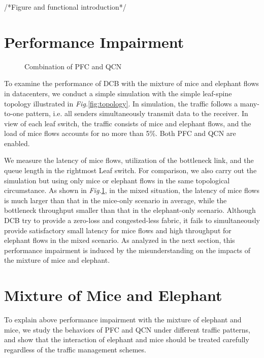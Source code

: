 \documentclass[]{sig-alternate-10pt}
\begin{document}
/*Figure and functional introduction*/
\fi
 \section{Performance Impairment}
\label{motivation}


\begin{figure}
	\centering
	\hfill
\caption{Combination of PFC and QCN}
\label{fig:impairment}
\end{figure}

To examine the performance of DCB with the mixture of mice and elephant flows in datacenters, we conduct a simple simulation with the simple leaf-spine topology illustrated in \emph{Fig.}\ref{fig:topology}.
In simulation, the traffic follows a many-to-one pattern, i.e. all senders simultaneously transmit data to the receiver.
In view of each leaf switch, the traffic consists of mice and elephant flows, and the load of mice flows accounts for no more than 5\%. Both PFC and QCN are enabled.


We measure the latency of mice flows, utilization of the bottleneck link, and the queue length in the rightmost Leaf switch.
For comparison, we also carry out the simulation but using only mice or elephant flows in the same topological circumstance.
As shown in \emph{Fig.}\ref{fig:impairment}, in the mixed situation, the latency of mice flows is much larger than that in the mice-only scenario in average, while the bottleneck throughput smaller than that in the elephant-only scenario.
Although DCB try to provide a zero-loss and congested-less fabric, it fails to simultaneously provide satisfactory small latency for mice flows and high throughput for elephant flows in the mixed scenario. As analyzed in the next section, this performance impairment is induced by the misunderstanding on the impacts of the mixture of mice and elephant.

 \section{Mixture of   Mice and Elephant}
\label{understand}
To explain above performance impairment with the mixture of elephant and mice, we study the behaviors of PFC and QCN under different traffic patterns, and show that the interaction of elephant and mice should be treated carefully regardless of the traffic management schemes.
\end{document}
